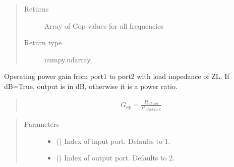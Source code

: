 \documentclass[letterpaper,10pt,english]{sphinxmanual}
\begin{document}
\begin{fulllineitems}
\begin{fulllineitems}
\begin{quote}
\begin{description}
\begin{itemize}
\end{itemize}

\item[{Returns}] \leavevmode
Array of Gop values for all frequencies

\item[{Return type}] \leavevmode
numpy.ndarray

\end{description}\end{quote}

\end{fulllineitems}


\begin{fulllineitems}
\label{\detokenize{touchstone:touchstone.spfile.gop2}}
Operating power gain from port1 to port2 with load impedance of ZL. If dB=True, output is in dB, otherwise it is a power ratio.
\begin{quote}
\begin{equation*}
\begin{split}G_{op}=\frac{P_{toLoad}}{P_{toNetwork}}\end{split}
\end{equation*}\end{quote}
\begin{quote}\begin{description}
\item[{Parameters}] \leavevmode\begin{itemize}
\item {} 
 (\sphinxstyleliteralemphasis{\sphinxupquote{, }}) \textendash{} Index of input port. Defaults to 1.

\item {} 
 (\sphinxstyleliteralemphasis{\sphinxupquote{, }}) \textendash{} Index of output port. Defaults to 2.


\end{itemize}
\end{description}
\end{quote}
\end{fulllineitems}
\end{fulllineitems}
\end{document}

